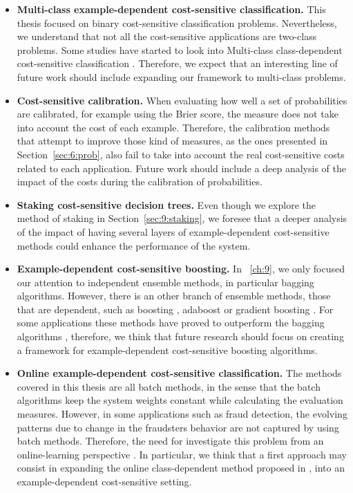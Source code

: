 \begin{itemize}
 \item \textbf{Multi-class example-dependent cost-sensitive classification.} This thesis  
focused on binary cost-sensitive classification problems. Nevertheless, we understand 
that not all the cost-sensitive applications are two-class problems. Some studies have started to 
look into Multi-class class-dependent cost-sensitive classification \citep{Zhou2010}. Therefore, we 
expect that an interesting line of future work should include expanding our framework to 
multi-class problems.

 \item \textbf{Cost-sensitive calibration.} When evaluating how well a set of probabilities are 
calibrated, for example using the Brier score, the measure does not take into account the cost of 
each example. Therefore, the calibration methods that attempt to improve those kind of measures, as 
the ones presented in Section~\ref{sec:6:prob}, also fail to take into account the real 
cost-sensitive costs related to each application. Future work should include a deep analysis of the 
impact of the costs during the calibration of probabilities.

  \item \textbf{Staking cost-sensitive decision trees.} Even though we explore the method of 
staking in Section~\ref{sec:9:staking}, we foresee that a deeper analysis of the impact of having 
several layers of example-dependent cost-sensitive methods could enhance the performance of the 
system.

  \item \textbf{Example-dependent cost-sensitive boosting.} In \chaptername{~\ref{ch:9}}, we 
only focused our attention to independent ensemble methods, in particular bagging algorithms. 
However, there is an other branch of ensemble methods, those that are dependent, such as 
boosting \citep{Schapire1990}, adaboost \citep{Freund1996} or gradient boosting 
\citep{Friedman2001,Friedman2002}. For some applications these methods have proved to outperform 
the bagging algorithms \citep{Zhou2012}, therefore, we think that future research should focus on 
creating a framework for example-dependent cost-sensitive boosting algorithms.

  \item \textbf{Online example-dependent cost-sensitive classification.} The methods covered in 
this thesis are all batch methods, in the sense that the batch algorithms keep the system weights 
constant while calculating the evaluation measures. However, in some applications such as fraud 
detection, the evolving patterns due to change in the fraudsters behavior are not captured by using 
batch methods. Therefore, the need for investigate this problem from an online-learning perspective 
\citep{Pozzolo2014}. In particular, we think that a first approach may consist in expanding the 
online class-dependent method proposed in \citep{Wang2014}, into an example-dependent cost-sensitive 
setting.

\end{itemize}

